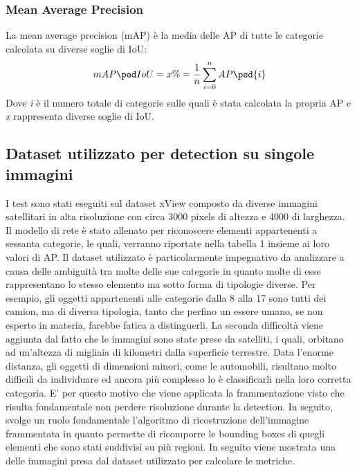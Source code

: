\subsubsection{Mean Average Precision}
La mean average precision (mAP) è la media delle AP di tutte le categorie calcolata su diverse soglie di IoU:
\[
    mAP\ped{IoU=x\%} = \frac{1}{n}\sum_{i=0}^{n}AP\ped{i}
\]
Dove \textit{i} è il numero totale di categorie sulle quali è stata calcolata la propria AP e \textit{x} rappresenta diverse soglie di IoU.

\subsection{Dataset utilizzato per detection su singole immagini}
I test sono stati eseguiti sul dataset xView composto da diverse immagini satellitari in alta risoluzione con circa 3000 pixels di altezza e 4000 di larghezza. Il modello di rete è stato allenato per riconoscere elementi appartenenti a sessanta categorie, le quali, verranno riportate nella tabella 1 insieme ai loro valori di AP. Il dataset utilizzato è particolarmente impegnativo da analizzare a causa delle ambiguità tra molte delle sue categorie in quanto molte di esse rappresentano lo stesso elemento ma sotto forma di tipologie diverse. Per esempio, gli oggetti appartenenti alle categorie dalla 8 alla 17 sono tutti dei camion, ma di diversa tipologia, tanto che perfino un essere umano, se non esperto in materia, farebbe fatica a distinguerli. La seconda difficoltà viene aggiunta dal fatto che le immagini sono state prese da satelliti, i quali, orbitano ad un'altezza di migliaia di kilometri dalla superficie terrestre. Data l'enorme distanza, gli oggetti di dimensioni minori, come le automobili, risultano molto difficili da individuare ed ancora più complesso lo è classificarli nella loro corretta categoria. E' per questo motivo che viene applicata la frammentazione visto che risulta fondamentale non perdere risoluzione durante la detection. In seguito, svolge un ruolo fondamentale l'algoritmo di ricostruzione dell'immagine frammentata in quanto permette di ricomporre le bounding boxes di quegli elementi che sono stati suddivisi su più regioni. In seguito viene mostrata una delle immagini presa dal dataset utilizzato per calcolare le metriche.
